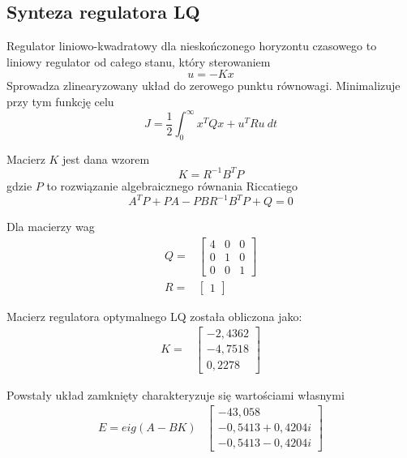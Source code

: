 \subsection{Synteza regulatora LQ}

Regulator liniowo-kwadratowy dla nieskończonego horyzontu czasowego to liniowy regulator od całego stanu, który sterowaniem
\begin{equation}
u = -Kx
\end{equation}
Sprowadza zlinearyzowany układ do zerowego punktu równowagi. Minimalizuje przy tym funkcję celu
\begin{equation}
J = \dfrac{1}{2} \int _0^{\infty} {x^T Q x + u^T R u}\: dt
\end{equation}

Macierz $K$ jest dana wzorem
\begin{equation}
K = R^{-1}B^T P
\end{equation}
gdzie $P$ to rozwiązanie algebraicznego równania Riccatiego
\begin{equation}
A^T P + PA -PBR^{-1}B^T P + Q = 0
\end{equation}

Dla macierzy wag
\[
\begin{array}{lc}
Q = &
\begin{bmatrix} 4 & 0 & 0 \\
0 & 1 & 0 \\
0 & 0 & 1
\end{bmatrix}
\\
R = & \begin{bmatrix}
1
\end{bmatrix}
\end{array}
\]
    
Macierz regulatora optymalnego LQ została obliczona jako:
\[
\begin{array}{lc}
K = &
\begin{bmatrix}
 -2,4362 \\  -4,7518  \\  0,2278
\end{bmatrix}
\end{array}
\]

Powstały układ zamknięty charakteryzuje się wartościami własnymi
\[
\begin{array}{lc}
E = eig(A-BK) &
\begin{bmatrix}
  -43,058 \\
  -0,5413 + 0,4204i \\
  -0,5413 - 0,4204i
\end{bmatrix}
\end{array}
\]

